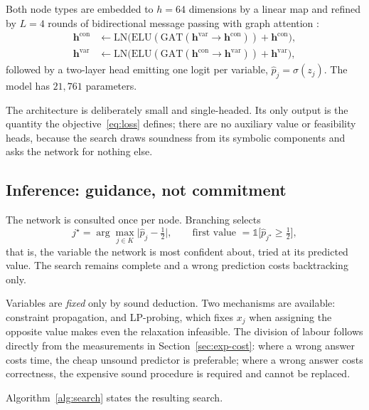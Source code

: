 \documentclass[11pt]{article}
\begin{document}
Both node types are embedded to $h=64$ dimensions by a linear map and refined by $L=4$ rounds of bidirectional message passing with graph attention \citep{velickovic2018graph}:
\begin{align}
\mathbf{h}^{\mathrm{con}} &\leftarrow \mathrm{LN}\big(\mathrm{ELU}(\mathrm{GAT}(\mathbf{h}^{\mathrm{var}}\!\to\!\mathbf{h}^{\mathrm{con}})) + \mathbf{h}^{\mathrm{con}}\big),\\
\mathbf{h}^{\mathrm{var}} &\leftarrow \mathrm{LN}\big(\mathrm{ELU}(\mathrm{GAT}(\mathbf{h}^{\mathrm{con}}\!\to\!\mathbf{h}^{\mathrm{var}})) + \mathbf{h}^{\mathrm{var}}\big),
\end{align}
followed by a two-layer head emitting one logit per variable, $\hat{p}_j = \sigma(z_j)$. The model has $21{,}761$ parameters.

The architecture is deliberately small and single-headed. Its only output is the quantity the objective~\eqref{eq:loss} defines; there are no auxiliary value or feasibility heads, because the search draws soundness from its symbolic components and asks the network for nothing else.

\subsection{Inference: guidance, not commitment}
\label{sec:method-inference}

The network is consulted once per node. Branching selects
\begin{equation}
j^\star = \arg\max_{j\in K} \big|\hat{p}_j - \tfrac12\big|,
\qquad
\text{first value } = \mathbb{1}\big[\hat{p}_{j^\star}\ge\tfrac12\big],
\end{equation}
that is, the variable the network is most confident about, tried at its predicted value. The search remains complete and a wrong prediction costs backtracking only.

Variables are \emph{fixed} only by sound deduction. Two mechanisms are available: constraint propagation, and LP-probing, which fixes $x_j$ when assigning the opposite value makes even the relaxation infeasible. The division of labour follows directly from the measurements in Section~\ref{sec:exp-cost}: where a wrong answer costs time, the cheap unsound predictor is preferable; where a wrong answer costs correctness, the expensive sound procedure is required and cannot be replaced.

Algorithm~\ref{alg:search} states the resulting search.
\end{document}
